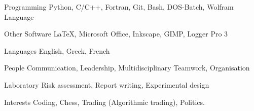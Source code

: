 

\begin{cvskills}

  \cvskill
    {Programming} %
    {Python, C/C++, Fortran, Git, Bash, DOS-Batch, Wolfram Language} %

	\cvskill
		{Other Software}
		{LaTeX, Microsoft Office, Inkscape, GIMP, Logger Pro 3}

  \cvskill
    {Languages} %
    {English, Greek, French} %

	\cvskill
		{People}
		{Communication, Leadership, Multidisciplinary Teamwork, Organisation}

	\cvskill
		{Laboratory}
		{Risk assessment, Report writing, Experimental design}

	\cvskill
		{Interests}
		{Coding, Chess, Trading (Algorithmic trading), Politics.}
\end{cvskills}
